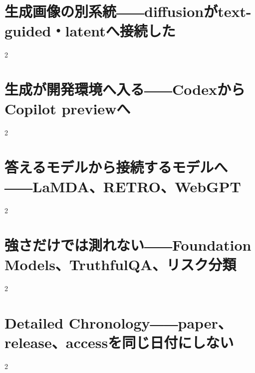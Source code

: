 \documentclass[lualatex,a4paper,11pt]{jlreq}
\begin{document}
\clearpage
\section{生成画像の別系統――diffusionがtext-guided・latentへ接続した}
\label{pkg:diffusion-media}

\medskip
\begin{multicols}{2}

\end{multicols}


\clearpage
\section{生成が開発環境へ入る――CodexからCopilot previewへ}
\label{pkg:code-developer-interface}

\medskip
\begin{multicols}{2}

\end{multicols}


\clearpage
\section{答えるモデルから接続するモデルへ――LaMDA、RETRO、WebGPT}
\label{pkg:dialogue-retrieval-grounding}

\medskip
\begin{multicols}{2}

\end{multicols}


\clearpage
\section{強さだけでは測れない――Foundation Models、TruthfulQA、リスク分類}
\label{pkg:evaluation-risk-foundation}

\medskip
\begin{multicols}{2}

\end{multicols}


\clearpage
\section{Detailed Chronology――paper、release、accessを同じ日付にしない}
\label{pkg:annual-chronology}

\medskip
\begin{multicols}{2}

\end{multicols}
\end{document}

